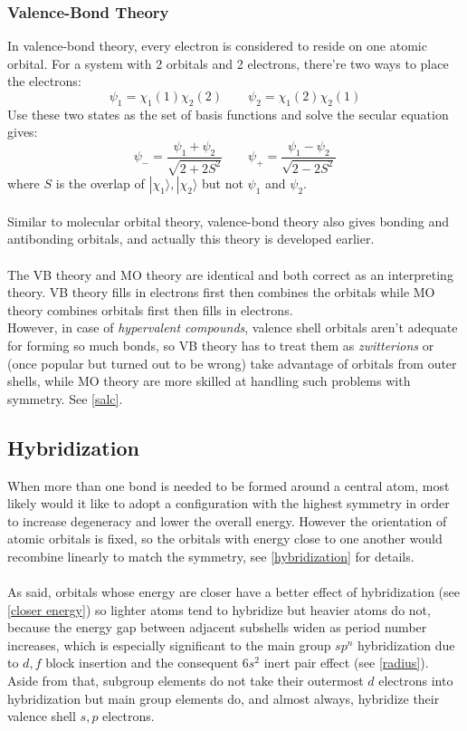 \subsubsection{Valence-Bond Theory}

	In valence-bond theory, every electron is considered to reside on one atomic orbital.
	For a system with 2 orbitals and 2 electrons, there're two ways to place the electrons:
%	
	\[
	\psi_1 = \chi_1(1)\chi_2(2)
	\qquad
	\psi_2 = \chi_1(2)\chi_2(1)
	\]
%	
	Use these two states as the set of basis functions and solve the secular equation gives:
%	
	\[
	\psi_- = \frac{\psi_1+\psi_2}{\sqrt{2+2S^2}} 
	\qquad 
	\psi_+ = \frac{\psi_1-\psi_2}{\sqrt{2-2S^2}}
	\]
%	
	where $S$ is the overlap of ${|\chi_1\rangle, |\chi_2\rangle}$ but not $\psi_1$ and $\psi_2$.\\ \\
%
	Similar to molecular orbital theory, valence-bond theory also gives bonding and antibonding orbitals, 
	and actually this theory is developed earlier.\\ \\
%	
	The VB theory and MO theory are identical and both correct as an interpreting theory. 
	VB theory fills in electrons first then combines the orbitals while MO theory combines orbitals first then fills in electrons.\\
	However, in case of \emph{hypervalent compounds}, valence shell orbitals aren't adequate for forming so much bonds, 
	so VB theory has to treat them as \emph{zwitterions} or (once popular but turned out to be wrong) take advantage of orbitals from outer shells,
	while MO theory are more skilled at handling such problems with symmetry. See \ref{salc}.
	
\subsection{Hybridization}

	When more than one bond is needed to be formed around a central atom, 
	most likely would it like to adopt a configuration with the highest symmetry in order to increase degeneracy and lower the overall energy.
	However the orientation of atomic orbitals is fixed, 
	so the orbitals with energy close to one another would recombine linearly to match the symmetry, see \ref{hybridization} for details.\\\ \\
	As said, orbitals whose energy are closer have a better effect of hybridization (see \ref{closer energy}) 
	so lighter atoms tend to hybridize but heavier atoms do not, because the energy gap between adjacent subshells widen as period number increases, 
	which is especially significant to the main group $sp^n$ hybridization 
	due to $d,f$ block insertion and the consequent $6s^2$ inert pair effect (see \ref{radius}).
	Aside from that, subgroup elements do not take their outermost $d$ electrons into hybridization 
	but main group elements do, and almost always, hybridize their valence shell $s,p$ electrons.
	
